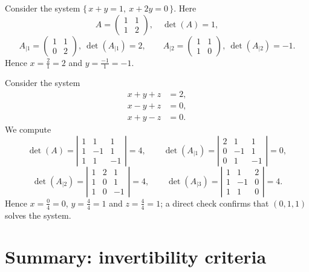 \begin{example}
Consider the system $\{\,x+y = 1,\ x+2y = 0\,\}$. Here
\[
A = \left ( \begin{array}{cc} 1 & 1\\ 1 & 2 \end{array} \right ), \quad \det(A) = 1,
\]
\[
A_{|1} = \left ( \begin{array}{cc} 1 & 1\\ 0 & 2 \end{array} \right ), \ \det(A_{|1}) = 2, \qquad
A_{|2} = \left ( \begin{array}{cc} 1 & 1\\ 1 & 0 \end{array} \right ), \ \det(A_{|2}) = -1.
\]
Hence $x=\tfrac{2}{1}=2$ and $y=\tfrac{-1}{1}=-1$.
\end{example}

\begin{example}
Consider the system
\[
\begin{aligned}
x+y+z &= 2,\\ x-y+z &= 0,\\ x+y-z &= 0.
\end{aligned}
\]
We compute
\[
\det(A) = \left| \begin{array}{ccc} 1 & 1 & 1\\ 1 & -1 & 1\\ 1 & 1 & -1 \end{array} \right| = 4,
\qquad
\det(A_{|1}) = \left| \begin{array}{ccc} 2 & 1 & 1\\ 0 & -1 & 1\\ 0 & 1 & -1 \end{array} \right| = 0,
\]
\[
\det(A_{|2}) = \left| \begin{array}{ccc} 1 & 2 & 1\\ 1 & 0 & 1\\ 1 & 0 & -1 \end{array} \right| = 4,
\qquad
\det(A_{|3}) = \left| \begin{array}{ccc} 1 & 1 & 2\\ 1 & -1 & 0\\ 1 & 1 & 0 \end{array} \right| = 4.
\]
Hence $x = \tfrac04 = 0$, $y = \tfrac44 = 1$ and $z = \tfrac44 = 1$; a direct check confirms that $(0,1,1)$
solves the system.
\end{example}

\section{Summary: invertibility criteria}

